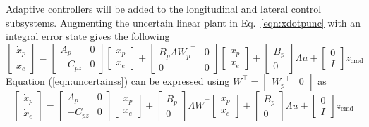 \documentclass[]{../sty/aiaa-tc}
\begin{document}
  Adaptive controllers will be added to the longitudinal and lateral control subsystems.
  Augmenting the uncertain linear plant in Eq.\ \eqref{eqn:xdotpunc} with an integral error state gives the following
  \begin{equation}
    \label{eqn:uncertainss}
    \begin{bmatrix}
      \dot{x}_{p} \\
      \dot{x}_{e}
    \end{bmatrix}=
    \begin{bmatrix}
      A_{p} & 0 \\
      -C_{pz} & 0
    \end{bmatrix}
    \begin{bmatrix}
      x_{p} \\
      x_{e}
    \end{bmatrix}+
    \begin{bmatrix}
      B_{p}\Lambda{W_{p}}^{\top} & 0 \\
      0 & 0
    \end{bmatrix}
    \begin{bmatrix}
      x_{p} \\
      x_{e}
    \end{bmatrix}+
    \begin{bmatrix}
      B_{p} \\
      0
    \end{bmatrix}\Lambda u+
    \begin{bmatrix}
      0 \\
      I
    \end{bmatrix}z_{\text{cmd}}
  \end{equation}
  Equation (\ref{eqn:uncertainss}) can be expressed using $W^{\top}=[\begin{array}{cc} {W_{p}}^{\top} & 0\end{array}]$ as
  \begin{equation*}
    \begin{bmatrix}
      \dot{x}_{p} \\
      \dot{x}_{e}
    \end{bmatrix}=
    \begin{bmatrix}
      A_{p} & 0 \\
      -C_{pz} & 0
    \end{bmatrix}
    \begin{bmatrix}
      x_{p} \\
      x_{e}
    \end{bmatrix}+
    \begin{bmatrix}
      B_{p} \\
      0
    \end{bmatrix}\Lambda W^{\top}
    \begin{bmatrix}
      x_{p} \\
      x_{e}
    \end{bmatrix}+
    \begin{bmatrix}
      B_{p} \\
      0
    \end{bmatrix}\Lambda u+
    \begin{bmatrix}
      0 \\
      I
    \end{bmatrix}z_{\text{cmd}}
  \end{equation*}
\end{document}
